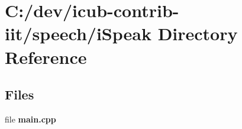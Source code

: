 \section{C\+:/dev/icub-\/contrib-\/iit/speech/i\+Speak Directory Reference}
\label{dir_35b150ffb1e1ca6360c4d1c0af033726}
\subsection*{Files}
\begin{DoxyCompactItemize}
\item 
file {\bfseries main.\+cpp}
\end{DoxyCompactItemize}
